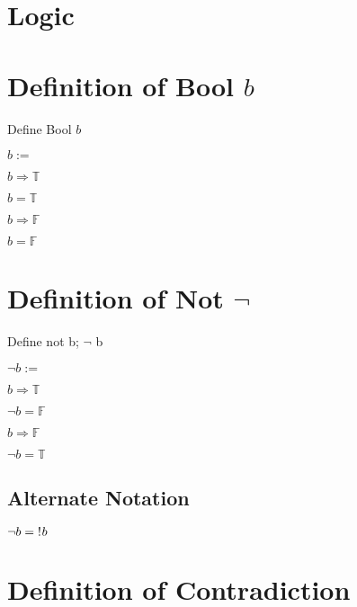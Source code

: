 \documentclass[11pt]{article}
\begin{document}
\section*{Logic}



\section{Definition of Bool $b$}
Define Bool $b$
\begin{center}
\vspace{1mm}
$
b :=
$
\end{center}
$b \Rightarrow \mathbb{T}$
\begin{center}
\vspace{1mm}
$
b = \mathbb{T}
$
\end{center}
$b \Rightarrow \mathbb{F}$
\begin{center}
\vspace{1mm}
$
b = \mathbb{F}
$
\end{center}


\section{Definition of Not $\lnot$}
Define not b; \hspace{.2mm}$\lnot$ b
\begin{center}
\vspace{2mm}
$
\lnot b :=
$
\end{center}
$b \Rightarrow \mathbb{T}$
\begin{center}
$\lnot b = \mathbb{F}$\\
\end{center}
$b \Rightarrow \mathbb{F}$
\begin{center}
$
\lnot b = \mathbb{T}
$
\end{center}

\subsection{Alternate Notation}
\begin{center}
$
\lnot b = \hspace{1mm} !\hspace{.2mm}b
$
\end{center}





\section{Definition of Contradiction}
\end{document}
